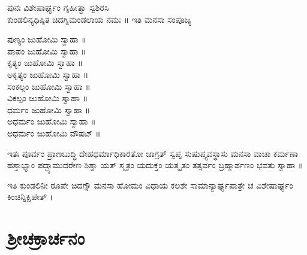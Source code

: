 ಪುನಃ ವಿಶೇಷಾರ್ಘ್ಯಂ ಗೃಹೀತ್ವಾ  ಸ್ವಶಿರಸಿ\\
 ಕುಂಡಲಿನ್ಯಧಿಷ್ಠಿತ ಚಿದಗ್ನಿಮಂಡಲಾಯ ನಮಃ ॥ ಇತಿ ಮನಸಾ ಸಂಪೂಜ್ಯ 

 ಪುಣ್ಯಂ ಜುಹೋಮಿ ಸ್ವಾಹಾ ॥\\
 ಪಾಪಂ ಜುಹೋಮಿ ಸ್ವಾಹಾ ॥\\
 ಕೃತ್ಯಂ ಜುಹೋಮಿ ಸ್ವಾಹಾ ॥\\
 ಅಕೃತ್ಯಂ ಜುಹೋಮಿ ಸ್ವಾಹಾ ॥\\
 ಸಂಕಲ್ಪಂ ಜುಹೋಮಿ ಸ್ವಾಹಾ ॥\\
 ವಿಕಲ್ಪಂ ಜುಹೋಮಿ ಸ್ವಾಹಾ ॥\\
 ಧರ್ಮಂ ಜುಹೋಮಿ ಸ್ವಾಹಾ ॥\\
 ಅಧರ್ಮಂ ಜುಹೋಮಿ ಸ್ವಾಹಾ ॥\\
 ಅಧರ್ಮಂ ಜುಹೋಮಿ ವೌಷಟ್ ॥

 ಇತಃ ಪೂರ್ವಂ ಪ್ರಾಣಬುದ್ಧಿ ದೇಹಧರ್ಮಾಧಿಕಾರತೋ ಜಾಗ್ರತ್ ಸ್ವಪ್ನ ಸುಷುಪ್ತ್ಯವಸ್ಥಾಸು ಮನಸಾ ವಾಚಾ ಕರ್ಮಣಾ ಹಸ್ತಾಭ್ಯಾಂ ಪದ್ಭ್ಯಾಮುದರೇಣ ಶಿಶ್ನಾ ಯತ್ ಸ್ಮೃತಂ ಯದುಕ್ತಂ ಯತ್ಕೃತಂ ತತ್ಸರ್ವಂ ಬ್ರಹ್ಮಾರ್ಪಣಂ ಭವತು ಸ್ವಾಹಾ ॥

 ಇತಿ ಕುಂಡಲಿನೀ ರೂಪೇ ಚಿದಗ್ನೌ ಮನಸಾ ಹೋಮಂ ವಿಧಾಯ ಕಲಶೇ ಸಾಮಾನ್ಯಾರ್ಘ್ಯಪಾತ್ರೇ ಚ ವಿಶೇಷಾರ್ಘ್ಯಂ ಕಿಂಚಿನ್ನಿಕ್ಷಿಪೇತ್ ।
‌\chapter*{\center ಶ್ರೀಚಕ್ರಾರ್ಚನಂ}
